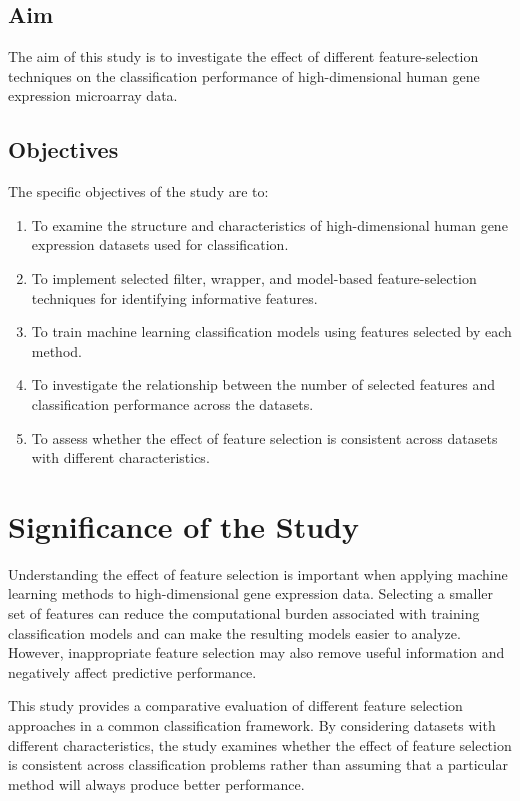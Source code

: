 \subsection{Aim}


The aim of this study is to investigate the effect of different feature-selection techniques on the classification performance of high-dimensional human gene expression microarray data.

\subsection{Objectives}

The specific objectives of the study are to:

\begin{enumerate}
\item To examine the structure and characteristics of high-dimensional human gene expression datasets used for classification.

\item To implement selected filter, wrapper, and model-based feature-selection techniques for identifying informative features.

\item To train machine learning classification models using features selected by each method.

\item To investigate the relationship between the number of selected features and classification performance across the datasets.

\item To assess whether the effect of feature selection is consistent across datasets with different characteristics.


\end{enumerate}

\section{Significance of the Study}
Understanding the effect of feature selection is important when applying machine learning methods to high-dimensional gene expression data. Selecting a smaller set of features can reduce the computational burden associated with training classification models and can make the resulting models easier to analyze. However, inappropriate feature selection may also remove useful information and negatively affect predictive performance.

This study provides a comparative evaluation of different feature selection approaches in a common classification framework. By considering datasets with different characteristics, the study examines whether the effect of feature selection is consistent across classification problems rather than assuming that a particular method will always produce better performance.

